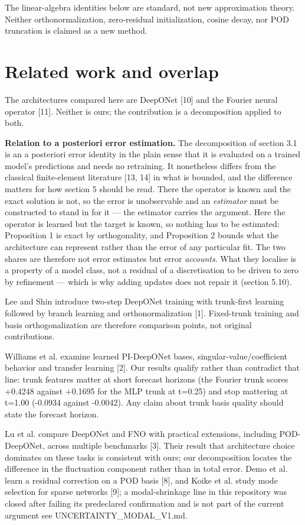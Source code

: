 \documentclass[preprint,12pt]{elsarticle}
\begin{document}
The linear-algebra identities below are standard, not new approximation theory. Neither orthonormalization, zero-residual initialization, cosine decay, nor POD truncation is claimed as a new method.

\section{Related work and overlap}

The architectures compared here are DeepONet [10] and the Fourier neural operator [11]. Neither is ours; the contribution is a decomposition applied to both.

\textbf{Relation to a posteriori error estimation.} The decomposition of section 3.1 is an a posteriori error identity in the plain sense that it is evaluated on a trained model's predictions and needs no retraining. It nonetheless differs from the classical finite-element literature [13, 14] in what is bounded, and the difference matters for how section 5 should be read. There the operator is known and the exact solution is not, so the error is unobservable and an \emph{estimator} must be constructed to stand in for it --- the estimator carries the argument. Here the operator is learned but the target is known, so nothing has to be estimated: Proposition 1 is exact by orthogonality, and Proposition 2 bounds what the architecture can represent rather than the error of any particular fit. The two shares are therefore not error estimates but error \emph{accounts}. What they localise is a property of a model class, not a residual of a discretisation to be driven to zero by refinement --- which is why adding updates does not repair it (section 5.10).

Lee and Shin introduce two-step DeepONet training with trunk-first learning followed by branch learning and orthonormalization [1]. Fixed-trunk training and basis orthogonalization are therefore comparison points, not original contributions.

Williams et al. examine learned PI-DeepONet bases, singular-value/coefficient behavior and transfer learning [2]. Our results qualify rather than contradict that line: trunk features matter at short forecast horizons (the Fourier trunk scores +0.4248 against +0.1695 for the MLP trunk at t=0.25) and stop mattering at t=1.00 (-0.0934 against -0.0042). Any claim about trunk basis quality should state the forecast horizon.

Lu et al. compare DeepONet and FNO with practical extensions, including POD-DeepONet, across multiple benchmarks [3]. Their result that architecture choice dominates on these tasks is consistent with ours; our decomposition locates the difference in the fluctuation component rather than in total error. Demo et al. learn a residual correction on a POD basis [8], and Koike et al. study mode selection for sparse networks [9]; a modal-shrinkage line in this repository was closed after failing its predeclared confirmation and is not part of the current argument see UNCERTAINTY\_MODAL\_V1.md.
\end{document}
